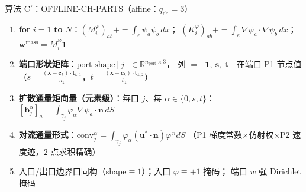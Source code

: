 \documentclass[11pt]{article}
\newcommand{\iface}{\gamma}
\newcommand{\dd}{\,dx}
\newcommand{\kwd}[1]{\textbf{#1}}
\newenvironment{pseudo}[1]{\begin{algobox}{#1}%
  \begin{enumerate}[label={\ttfamily\arabic*}, leftmargin=3.4em, itemsep=1.5pt, topsep=1pt, parsep=0pt]}%
  {\end{enumerate}\end{algobox}}
\begin{document}
\begin{pseudo}{算法 C$'$：OFFLINE-CH-PARTS（affine：$q_{\mathrm{ch}}=3$）}
\item \kwd{for} $i=1$ \kwd{to} $N$：$(M^{\varphi}_i)_{ab}{+}{=}\int_e\psi_a\psi_b\dd$；
$(K^{\varphi}_i)_{ab}{+}{=}\int_e\nabla\psi_a\!\cdot\!\nabla\psi_b\dd$；
$\bm w^{\mathrm{mass}}=M^{\varphi}_i\bm 1$
\item \textbf{端口形状矩阵}：$\mathrm{port\_shape}[j]\in\mathbb R^{n_{\mathrm{port}}\times3}$，
列 $=[\bm 1,\ \bm s,\ \bm t]$ 在端口 P1 节点值
（$s=\frac{(\bm x-\bm c_k)\cdot\bm t_{k,1}}{a_k}$，$t=\frac{(\bm x-\bm c_k)\cdot\bm t_{k,2}}{b_k}$）
\item \textbf{扩散通量矩向量（元素级）}：每口 $j$、每 $\alpha\in\{0,s,t\}$：
$[\bm b_j^{\alpha}]_a=\int_{\iface_j}\varphi_\alpha\nabla\psi_a\!\cdot\!\bm n\,dS$
\item \textbf{对流通量形式}：$\mathrm{conv}_j^{\alpha}=\int_{\iface_j}\varphi_\alpha(\bm u^{*}\!\cdot\!\bm n)\varphi^{\,n}dS$
（P1 梯度常数$\times$仿射权$\times$P2 速度迹，2 点求积精确）
\item 入口/出口边界口同构（shape$\equiv1$）；入口 $\varphi\equiv+1$ 掩码；
端口 $w$ 强 Dirichlet 掩码
\end{pseudo}
\end{document}

